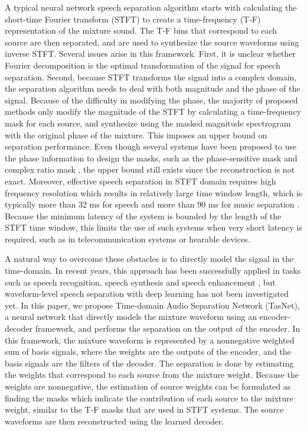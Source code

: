 \documentclass{article}
\begin{document}
A typical neural network speech separation algorithm starts with calculating the short-time Fourier transform (STFT) to create a time-frequency (T-F) representation of the mixture sound.  The T-F bins that correspond to each source are then separated, and are used to synthesize the source waveforms using inverse STFT. Several issues arise in this framework. First, it is unclear whether Fourier decomposition is the optimal transformation of the signal for speech separation. Second, because STFT transforms the signal into a complex domain, the separation algorithm needs to deal with both magnitude and the phase of the signal. Because of the difficulty in modifying the phase, the majority of proposed methods only modify the magnitude of the STFT by calculating a time-frequency mask for each source, and synthesize using the masked magnitude spectrogram with the original phase of the mixture. This imposes an upper bound on separation performance. Even though several systems have been proposed to use the phase information to design the masks, such as the phase-sensitive mask \cite{erdogan2015phase} and complex ratio mask \cite{williamson2016complex}, the upper bound still exists since the reconstruction is not exact. Moreover, effective speech separation in STFT domain requires high frequency resolution which results in relatively large time window length, which is typically more than 32 ms for speech \cite{isik2016single, kolbaek2017multitalker, chen2017deep} and more than 90 ms for music separation \cite{luo2017deep}. Because the minimum latency of the system is bounded by the length of the STFT time window, this limits the use of such systems when very short latency is required, such as in telecommunication systems or hearable devices. 

A natural way to overcome these obstacles is to directly model the signal in the time-domain. In recent years, this approach has been successfully applied in tasks such as speech recognition, speech synthesis and speech enhancement \cite{sainath2015learning, ghahremani2016acoustic, oord2016wavenet, mehri2016samplernn, pascual2017segan}, but waveform-level speech separation with deep learning has not been investigated yet. In this paper, we propose Time-domain Audio Separation Network (TasNet), a neural network that directly models the mixture waveform using an encoder-decoder framework, and performs the separation on the output of the encoder. In this framework, the mixture waveform is represented by a nonnegative weighted sum of  basis signals, where the weights are the outputs of the encoder, and the basis signals are the filters of the decoder. The separation is done by estimating the weights that correspond to each source from the mixture weight. Because the weights are nonnegative, the estimation of source weights can be formulated as finding the masks which indicate the contribution of each source to the mixture weight, similar to the T-F masks that are used in STFT systems. The source waveforms are then reconstructed using the learned decoder. 
\end{document}
